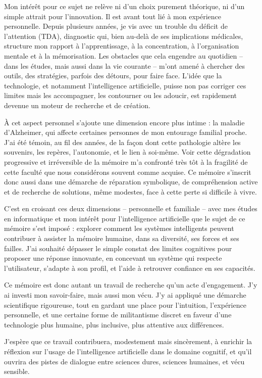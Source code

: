 \documentclass[11pt,a4paper]{report}
\begin{document}
Mon intérêt pour ce sujet ne relève ni d’un choix purement théorique, ni d’un simple attrait pour l’innovation. Il est avant tout lié à mon expérience personnelle. Depuis plusieurs années, je vis avec un trouble du déficit de l’attention (TDA), diagnostic qui, bien au-delà de ses implications médicales, structure mon rapport à l’apprentissage, à la concentration, à l’organisation mentale et à la mémorisation. Les obstacles que cela engendre au quotidien – dans les études, mais aussi dans la vie courante – m’ont amené à chercher des outils, des stratégies, parfois des détours, pour faire face. L’idée que la technologie, et notamment l’intelligence artificielle, puisse non pas corriger ces limites mais les accompagner, les contourner ou les adoucir, est rapidement devenue un moteur de recherche et de création.

À cet aspect personnel s’ajoute une dimension encore plus intime : la maladie d’Alzheimer, qui affecte certaines personnes de mon entourage familial proche. J’ai été témoin, au fil des années, de la façon dont cette pathologie altère les souvenirs, les repères, l’autonomie, et le lien à soi-même. Voir cette dégradation progressive et irréversible de la mémoire m’a confronté très tôt à la fragilité de cette faculté que nous considérons souvent comme acquise. Ce mémoire s’inscrit donc aussi dans une démarche de réparation symbolique, de compréhension active et de recherche de solutions, même modestes, face à cette perte si difficile à vivre.

C’est en croisant ces deux dimensions – personnelle et familiale – avec mes études en informatique et mon intérêt pour l’intelligence artificielle que le sujet de ce mémoire s’est imposé : explorer comment les systèmes intelligents peuvent contribuer à assister la mémoire humaine, dans sa diversité, ses forces et ses failles. J’ai souhaité dépasser le simple constat des limites cognitives pour proposer une réponse innovante, en concevant un système qui respecte l’utilisateur, s’adapte à son profil, et l’aide à retrouver confiance en ses capacités.

Ce mémoire est donc autant un travail de recherche qu’un acte d’engagement. J’y ai investi mon savoir-faire, mais aussi mon vécu. J’y ai appliqué une démarche scientifique rigoureuse, tout en gardant une place pour l’intuition, l’expérience personnelle, et une certaine forme de militantisme discret en faveur d’une technologie plus humaine, plus inclusive, plus attentive aux différences.

J’espère que ce travail contribuera, modestement mais sincèrement, à enrichir la réflexion sur l’usage de l’intelligence artificielle dans le domaine cognitif, et qu’il ouvrira des pistes de dialogue entre sciences dures, sciences humaines, et vécu sensible.
\end{document}
